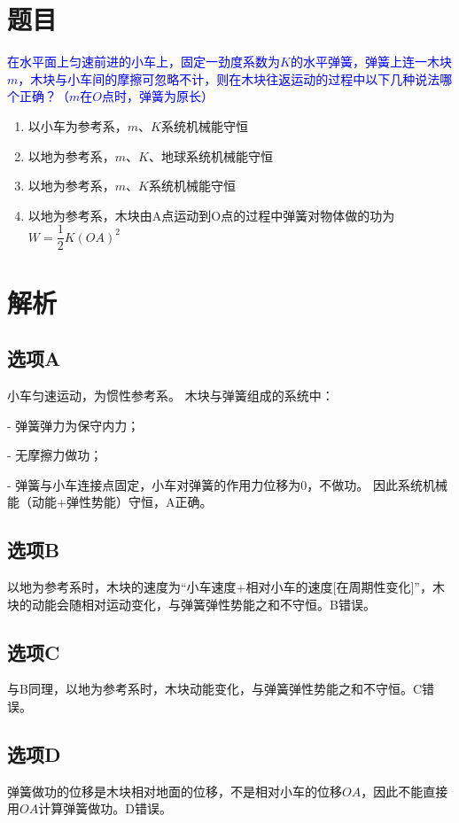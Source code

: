 \documentclass[11pt,a4paper]{article}
\begin{document}
\section*{题目}
\textcolor{blue}{在水平面上匀速前进的小车上，固定一劲度系数为$K$的水平弹簧，弹簧上连一木块$m$，木块与小车间的摩擦可忽略不计，则在木块往返运动的过程中以下几种说法哪个正确？（$m$在$O$点时，弹簧为原长）}

\begin{enumerate}
    \item[A] 以小车为参考系，$m$、$K$系统机械能守恒
    \item[B] 以地为参考系，$m$、$K$、地球系统机械能守恒
    \item[C] 以地为参考系，$m$、$K$系统机械能守恒
    \item[D] 以地为参考系，木块由A点运动到O点的过程中弹簧对物体做的功为$W = \dfrac{1}{2}K(OA)^2$
\end{enumerate}

\section*{解析}

\subsection*{选项A}
小车匀速运动，为惯性参考系。
木块与弹簧组成的系统中：

- 弹簧弹力为保守内力；

- 无摩擦力做功；

- 弹簧与小车连接点固定，小车对弹簧的作用力位移为0，不做功。
因此系统机械能（动能+弹性势能）守恒，A正确。

\subsection*{选项B}
以地为参考系时，木块的速度为“小车速度+相对小车的速度[在周期性变化]”，木块的动能会随相对运动变化，与弹簧弹性势能之和不守恒。B错误。

\subsection*{选项C}
与B同理，以地为参考系时，木块动能变化，与弹簧弹性势能之和不守恒。C错误。

\subsection*{选项D}
弹簧做功的位移是木块相对地面的位移，不是相对小车的位移$OA$，因此不能直接用$OA$计算弹簧做功。D错误。
\end{document}
